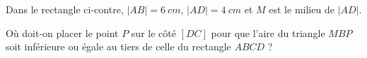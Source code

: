 \documentclass[a4paper, 12pt, parskip=half-, twoside=semi]{scrartcl}
\begin{document}
\begin{transferer}[points=2]
    Dans le rectangle ci-contre, $|AB| = \SI{6}{cm}$, $|AD|=\SI{4}{cm}$ et $M$ est le milieu de $|AD|$.

    Où doit-on placer le point $P$ sur le côté $[DC]$ pour que l'aire du triangle $MBP$ soit inférieure ou égale au tiers de celle du rectangle $ABCD$ ?
    \begin{center}
    \end{center}
\end{transferer}
\newpage
\printsolutions[headings=false]
\end{document}
